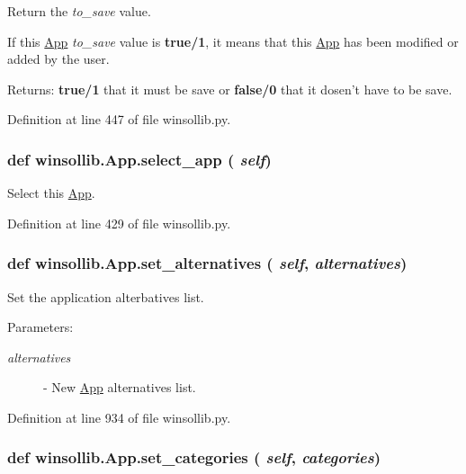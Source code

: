 Return the {\em to\_\-save\/} value. 

If this \hyperlink{classwinsollib_1_1App}{App} {\em to\_\-save\/} value is {\bf true/1}, it means that this \hyperlink{classwinsollib_1_1App}{App} has been modified or added by the user. \begin{Desc}
\item[Returns:]{\bf true/1} that it must be save or {\bf false/0} that it dosen't have to be save. \end{Desc}


Definition at line 447 of file winsollib.py.\hypertarget{classwinsollib_1_1App_ded960ca170881c056c50856badbfa48}{
\subsubsection[select\_\-app]{\setlength{\rightskip}{0pt plus 5cm}def winsollib.App.select\_\-app ( {\em self})}}
\label{classwinsollib_1_1App_ded960ca170881c056c50856badbfa48}


Select this \hyperlink{classwinsollib_1_1App}{App}. 



Definition at line 429 of file winsollib.py.\hypertarget{classwinsollib_1_1App_3d96046f852fa25380c7ac50b115ff39}{
\subsubsection[set\_\-alternatives]{\setlength{\rightskip}{0pt plus 5cm}def winsollib.App.set\_\-alternatives ( {\em self},  {\em alternatives})}}
\label{classwinsollib_1_1App_3d96046f852fa25380c7ac50b115ff39}


Set the application alterbatives list. 

\begin{Desc}
\item[Parameters:]
\begin{description}
\item[{\em alternatives}]- New \hyperlink{classwinsollib_1_1App}{App} alternatives list. \end{description}
\end{Desc}


Definition at line 934 of file winsollib.py.\hypertarget{classwinsollib_1_1App_53671291ce40f5ed9d125dec57f70902}{
\subsubsection[set\_\-categories]{\setlength{\rightskip}{0pt plus 5cm}def winsollib.App.set\_\-categories ( {\em self},  {\em categories})}}
\label{classwinsollib_1_1App_53671291ce40f5ed9d125dec57f70902}


